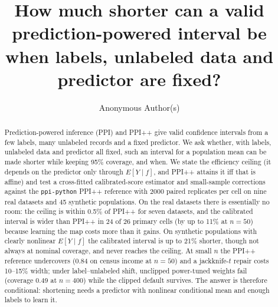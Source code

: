 \documentclass{article}
\title{How much shorter can a valid prediction-powered interval be when labels, unlabeled data and predictor are fixed?}
\author{Anonymous Author(s)}
\begin{document}
\maketitle

\begin{abstract}
Prediction-powered inference (PPI) and PPI++ give valid confidence intervals from a few labels, many unlabeled records and a fixed predictor. We ask whether, with labels, unlabeled data and predictor all fixed, such an interval for a population mean can be made shorter while keeping 95\% coverage, and when. We state the efficiency ceiling (it depends on the predictor only through $E[Y\mid f]$, and PPI++ attains it iff that is affine) and test a cross-fitted calibrated-score estimator and small-sample corrections against the \texttt{ppi-python} PPI++ reference with 2000 paired replicates per cell on nine real datasets and 45 synthetic populations. On the real datasets there is essentially no room: the ceiling is within 0.5\% of PPI++ for seven datasets, and the calibrated interval is wider than PPI++ in 24 of 26 primary cells (by up to 11\% at $n=50$) because learning the map costs more than it gains. On synthetic populations with clearly nonlinear $E[Y\mid f]$ the calibrated interval is up to 21\% shorter, though not always at nominal coverage, and never reaches the ceiling. At small $n$ the PPI++ reference undercovers (0.84 on census income at $n=50$) and a jackknife-$t$ repair costs 10--15\% width; under label--unlabeled shift, unclipped power-tuned weights fail (coverage 0.49 at $n=400$) while the clipped default survives. The answer is therefore conditional: shortening needs a predictor with nonlinear conditional mean and enough labels to learn it.
\end{abstract}












\newpage

\end{document}
